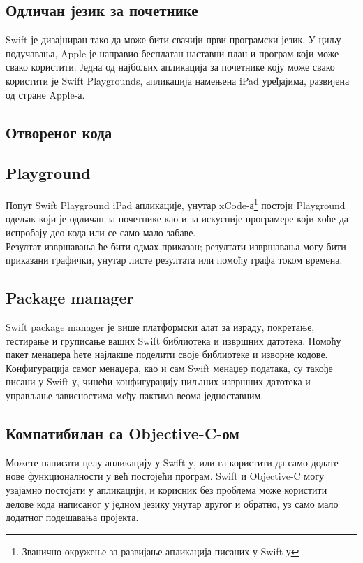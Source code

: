 \documentclass[12pt,oneside]{memoir}
\begin{document}
\subsection{Одличан језик за почетнике}

Swift је дизајниран тако да може бити свачији први програмски језик. У циљу подучавања, Apple је направио бесплатан наставни план и програм који може свако користити\cite{Swift_Education}. Једна од најбољих апликација за почетнике коју може свако користити је Swift Playgrounds\cite{Swift_Playground}, апликација намењена iPad уређајима, развијена од стране Apple-а. 

\subsection{Отвореног кода}


\subsection{Playground}

\indent Попут Swift Playground iPad апликације, унутар xCode-а\footnote{Званично окружење за развијање апликација писаних у Swift-у} постоји Playground одељак који је одличан за почетнике као и за искусније програмере који хоће да испробају део кода или се само мало забаве. \\
\indent Резултат извршавања ће бити одмах приказан; резултати извршавања могу бити приказани графички, унутар листе резултата или помоћу графа током времена. 

\subsection{Package manager}

Swift package manager је више платформски алат за израду, покретање, тестирање и груписање ваших Swift библиотека и извршних датотека. Помоћу пакет менаџера ћете најлакше поделити своје библиотеке и изворне кодове. Конфигурација самог менаџера, као и сам Swift менаџер података, су такође писани у Swift-у, чинећи конфигурацију циљаних извршних датотека и управљање зависностима међу пактима веома једноставним. 

\subsection{Компатибилан са Objective-C-ом}

Можете написати целу апликацију у Swift-у, или га користити да само додате нове функционалности у већ постојећи програм. Swift и Objective-C могу узајамно постојати у апликацији, и корисник без проблема може користити делове кода написаног у једном језику унутар другог и обратно, уз само мало додатног подешавања пројекта. \cite{Apple_Developer}
\end{document}
